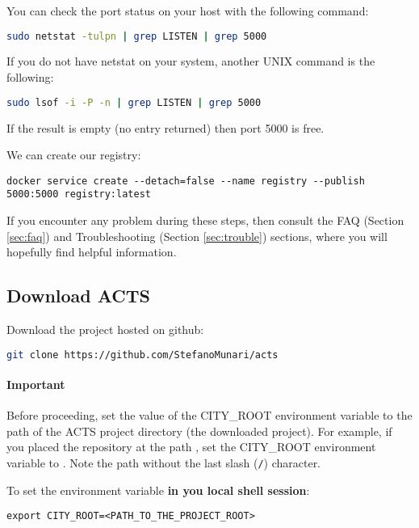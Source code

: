 You can check the port status on your host with the following command:

\begin{lstlisting}[language=bash]
sudo netstat -tulpn | grep LISTEN | grep 5000
\end{lstlisting}

If you do not have netstat on your system, another UNIX command is the
following:

\begin{lstlisting}[language=bash]
sudo lsof -i -P -n | grep LISTEN | grep 5000
\end{lstlisting}

If the result is empty (no entry returned) then port 5000 is free.

We can create our registry:

\begin{lstlisting}
docker service create --detach=false --name registry --publish 5000:5000 registry:latest
\end{lstlisting}

If you encounter any problem during these steps, then
consult the FAQ (Section \ref{sec:faq}) and
Troubleshooting (Section \ref{sec:trouble})
sections, where you will hopefully find
helpful information.


\subsection{Download ACTS}

Download the project hosted on github:

\begin{lstlisting}[language=bash]
git clone https://github.com/StefanoMunari/acts
\end{lstlisting}

\paragraph{Important}
Before proceeding, set the value
of the CITY\_ROOT environment variable to the path of the ACTS project
directory (the downloaded project).
For example, if you placed the repository at the path
, set the CITY\_ROOT environment variable to
. Note the path without the last slash (\texttt{/})
character.

To set the environment variable \textbf{in you local shell session}:
\begin{lstlisting}
export CITY_ROOT=<PATH_TO_THE_PROJECT_ROOT>
\end{lstlisting}

